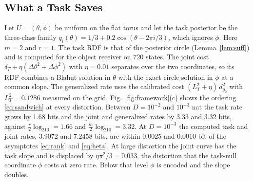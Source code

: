 \documentclass[10pt,journal]{IEEEtran}
\begin{document}
\subsection{What a Task Saves}
Let $U=(\theta,\phi)$ be uniform on the flat torus and let the task posterior be the three-class family $q_i(\theta)=1/3+0.2\cos(\theta-2\pi i/3)$, which ignores $\phi$. Here $m=2$ and $r=1$. The task RDF is that of the posterior circle (Lemma~\ref{lem:suff}) and is computed for the object receiver on 720 states. The joint cost $\delta_T+\eta(\Delta\theta^2+\Delta\phi^2)$ with $\eta=0.01$ separates over the two coordinates, so its RDF combines a Blahut solution in $\theta$ with the exact circle solution in $\phi$ at a common slope. The generalized rate uses the calibrated cost $(L_T^2+\eta)\,d_{g_0}^2$ with $L_T^2=0.1286$ measured on the grid. Fig.~\ref{fig:framework}(c) shows the ordering \eqref{eq:sandwich} at every distortion. Between $D=10^{-2}$ and $10^{-3}$ nat the task rate grows by 1.68 bits and the joint and generalized rates by 3.33 and 3.32 bits, against $\frac r2\log_210=1.66$ and $\frac m2\log_210=3.32$. At $D=10^{-3}$ the computed task and joint rates, 3.9072 and 7.2458 bits, are within 0.0025 and 0.0010 bit of the asymptotes \eqref{eq:rank} and \eqref{eq:heta}. At large distortion the joint curve has the task slope and is displaced by $\eta\pi^2/3=0.033$, the distortion that the task-null coordinate $\phi$ costs at zero rate. Below that level $\phi$ is encoded and the slope doubles.
\end{document}

